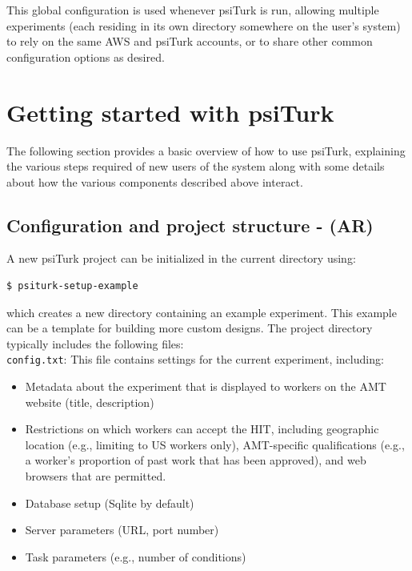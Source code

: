 \documentclass[twocolumn]{svjour3}          %
\begin{document}
This global configuration is used whenever psiTurk is run, allowing multiple experiments (each residing in its own directory somewhere on the user's system) to rely on the same AWS and psiTurk accounts, or to share other common configuration options as desired.



\section{Getting started with \textsf{psiTurk}}

The following section provides a basic overview of how to use psiTurk,
explaining the various steps required of new users of the system along with
some details about how the various components described above interact.

\subsection{Configuration and project structure - (AR)}

A new \textsf{psiTurk} project can be initialized in the current directory using:

\begin{lstlisting}
$ psiturk-setup-example
\end{lstlisting}

\noindent which creates a new directory containing an example experiment.
This example can be a template for building more custom designs.
The project directory typically includes the following files: \\


\noindent \texttt{config.txt}: This file contains settings for the current experiment, including:

\begin{itemize}
\item Metadata about the experiment that is displayed to workers on the AMT website (title, description)
\item Restrictions on which workers can accept the HIT, including geographic location (e.g., limiting to US workers only), AMT-specific qualifications (e.g., a worker's proportion of past work that has been approved), and web browsers that are permitted.
\item Database setup (Sqlite by default)
\item Server parameters (URL, port number)
\item Task parameters (e.g., number of conditions)
\end{itemize}
\end{document}
